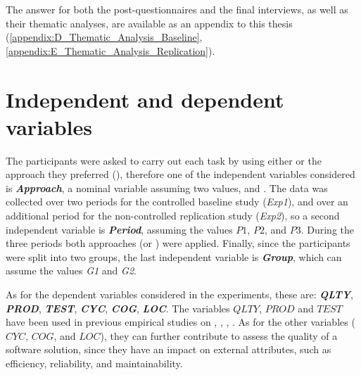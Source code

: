 The answer for both the post-questionnaires and the final interviews, as well as their thematic analyses, are available as an appendix to this thesis (\ref{appendix:D_Thematic_Analysis_Baseline}, \ref{appendix:E_Thematic_Analysis_Replication}).



\section{Independent and dependent variables}
The participants were asked to carry out each task by using either \tdd or the approach they preferred (\notdd), therefore one of the independent variables considered is \textbf{\textit{Approach}}, a nominal variable assuming two values, \tdd and \notdd. The data was collected over two periods for the controlled baseline study (\textit{Exp1}), and over an additional period for the non-controlled replication study (\textit{Exp2}), so a second independent variable is \textbf{\textit{Period}}, assuming the values $P1$, $P2$, and $P3$. During the three periods both approaches (\tdd or \notdd) were applied. Finally, since the participants were split into two groups, the last independent variable is \textbf{\textit{Group}}, which can assume the values \textit{G1} and \textit{G2}.

As for the dependent variables considered in the experiments, these are: \textbf{\textit{QLTY}}, \textbf{\textit{PROD}}, \textbf{\textit{TEST}}, \textbf{\textit{CYC}}, \textbf{\textit{COG}}, \textbf{\textit{LOC}}.
The variables $QLTY$, $PROD$ and $TEST$ have been used in previous empirical studies on \noess \cite{DBLP:journals/tse/ErdogmusMT05}, \cite{DBLP:journals/tse/FucciETOJ17}, \cite{DBLP:conf/esem/Fucci0BCSTJ18}, \cite{DBLP:journals/ese/TosunDFVTESOTJJ17}. As for the other variables (\ie $CYC$, $COG$, and $LOC$), they can further contribute to assess the quality of a software solution, since they have an impact on external attributes, such as efficiency, reliability, and maintainability.

